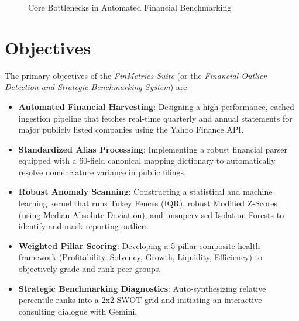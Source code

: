 \begin{figure}[htbp]
    \centering
    \caption{Core Bottlenecks in Automated Financial Benchmarking}
    \label{fig:bottlenecks}
\end{figure}

\section{Objectives}
The primary objectives of the \textit{FinMetrics Suite} (or the \textit{Financial Outlier Detection and Strategic Benchmarking System}) are:
\begin{itemize}
    \item \textbf{Automated Financial Harvesting}: Designing a high-performance, cached ingestion pipeline that fetches real-time quarterly and annual statements for major publicly listed companies using the Yahoo Finance API.
    \item \textbf{Standardized Alias Processing}: Implementing a robust financial parser equipped with a 60-field canonical mapping dictionary to automatically resolve nomenclature variance in public filings.
    \item \textbf{Robust Anomaly Scanning}: Constructing a statistical and machine learning kernel that runs Tukey Fences (IQR), robust Modified Z-Scores (using Median Absolute Deviation), and unsupervised Isolation Forests to identify and mask reporting outliers.
    \item \textbf{Weighted Pillar Scoring}: Developing a 5-pillar composite health framework (Profitability, Solvency, Growth, Liquidity, Efficiency) to objectively grade and rank peer groups.
    \item \textbf{Strategic Benchmarking Diagnostics}: Auto-synthesizing relative percentile ranks into a 2x2 SWOT grid and initiating an interactive consulting dialogue with Gemini.
\end{itemize}

